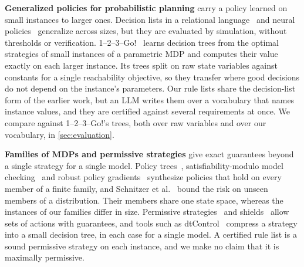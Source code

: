 \textbf{Generalized policies for probabilistic planning} carry a policy learned on small instances to larger ones.
Decision lists in a relational language~\cite{TODO-Yoon2002-inductive-policy,TODO-Fern2006-decision-lists} and neural policies~\cite{TODO-Toyer2020-ASNets,TODO-Garg2020-SymNet} generalize across sizes, but they are evaluated by simulation, without thresholds or verification.
1--2--3--Go!~\cite{TODO-Azeem2025-123Go} learns decision trees from the optimal strategies of small instances of a parametric MDP and computes their value exactly on each larger instance.
Its trees split on raw state variables against constants for a single reachability objective, so they transfer where good decisions do not depend on the instance's parameters.
Our rule lists share the decision-list form of the earlier work, but an LLM writes them over a vocabulary that names instance values, and they are certified against several requirements at once.
We compare against 1--2--3--Go!'s trees, both over raw variables and over our vocabulary, in \autoref{sec:evaluation}.

\textbf{Families of MDPs and permissive strategies} give exact guarantees beyond a single strategy for a single model.
Policy trees~\cite{TODO-Andriushchenko2024-PoliciesGrowOnTrees}, satisfiability-modulo model checking~\cite{TODO-Heck2026-SMPMC} and robust policy gradients~\cite{TODO-Galesloot2025-rfPG} synthesize policies that hold on every member of a finite family, and Schnitzer et al.~\cite{TODO-Schnitzer2025-robust-parametric} bound the risk on unseen members of a distribution.
Their members share one state space, whereas the instances of our families differ in size.
Permissive strategies~\cite{TODO-Draeger2015-permissive} and shields~\cite{TODO-Andriushchenko2026-probabilistic-shields} allow sets of actions with guarantees, and tools such as dtControl~\cite{TODO-Ashok2021-dtControl} compress a strategy into a small decision tree, in each case for a single model.
A certified rule list is a sound permissive strategy on each instance, and we make no claim that it is maximally permissive.
